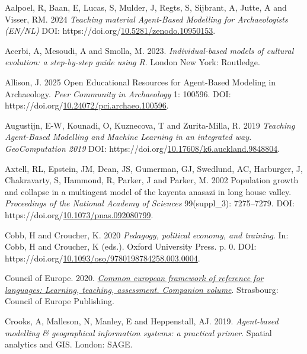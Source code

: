 \documentclass[
]{article}
\newlength{\cslhangindent}
\newlength{\cslentryspacingunit} %
\newenvironment{CSLReferences}[2] %
 {%
  \setlength{\parindent}{0pt}
  \ifodd #1
  \let\oldpar\par
  \def\par{\hangindent=\cslhangindent\oldpar}
  \fi
  \setlength{\parskip}{#2\cslentryspacingunit}
 }%
 {}
\begin{document}
\hypertarget{refs}{}
\begin{CSLReferences}{1}{0}
\leavevmode{}%
Aalpoel, R, Baan, E, Lucas, S, Mulder, J, Regts, S, Sijbrant, A, Jutte, A and Visser, RM. 2024 \emph{Teaching material Agent-Based Modelling for Archaeologists (EN/NL)} DOI: https://doi.org/\href{https://doi.org/10.5281/zenodo.10950153}{10.5281/zenodo.10950153}.

\leavevmode{}%
Acerbi, A, Mesoudi, A and Smolla, M. 2023. \emph{Individual-based models of cultural evolution: a step-by-step guide using R}. London New York: Routledge.

\leavevmode{}%
Allison, J. 2025 Open Educational Resources for Agent-Based Modeling in Archaeology. \emph{Peer Community in Archaeology} 1: 100596. DOI: https://doi.org/\href{https://doi.org/10.24072/pci.archaeo.100596}{10.24072/pci.archaeo.100596}.

\leavevmode{}%
Augustijn, E-W, Kounadi, O, Kuznecova, T and Zurita-Milla, R. 2019 \emph{Teaching Agent-Based Modelling and Machine Learning in an integrated way. GeoComputation 2019} DOI: https://doi.org/\href{https://doi.org/10.17608/k6.auckland.9848804}{10.17608/k6.auckland.9848804}.

\leavevmode{}%
Axtell, RL, Epstein, JM, Dean, JS, Gumerman, GJ, Swedlund, AC, Harburger, J, Chakravarty, S, Hammond, R, Parker, J and Parker, M. 2002 Population growth and collapse in a multiagent model of the kayenta anasazi in long house valley. \emph{Proceedings of the National Academy of Sciences} 99(suppl{\_}3): 7275--7279. DOI: https://doi.org/\href{https://doi.org/10.1073/pnas.092080799}{10.1073/pnas.092080799}.

\leavevmode{}%
Cobb, H and Croucher, K. 2020 \emph{Pedagogy, political economy, and training}. In: Cobb, H and Croucher, K (eds.). Oxford University Press. p. 0. DOI: https://doi.org/\href{https://doi.org/10.1093/oso/9780198784258.003.0004}{10.1093/oso/9780198784258.003.0004}.

\leavevmode{}%
Council of Europe. 2020. \emph{\href{http://www.coe.int/lang-cefr}{Common european framework of reference for languages: Learning, teaching, assessment. Companion volume}}. Strasbourg: Council of Europe Publishing.

\leavevmode{}%
Crooks, A, Malleson, N, Manley, E and Heppenstall, AJ. 2019. \emph{Agent-based modelling \& geographical information systems: a practical primer}. Spatial analytics and GIS. London: SAGE.


\end{CSLReferences}
\end{document}
